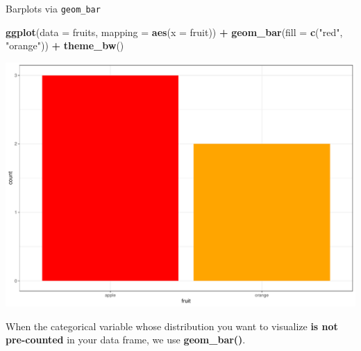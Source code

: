 \documentclass[
  ignorenonframetext,
]{beamer}
\newenvironment{Shaded}{\begin{snugshade}}{\end{snugshade}}
\newcommand{\AttributeTok}[1]{\textcolor[rgb]{0.13,0.29,0.53}{#1}}
\newcommand{\FunctionTok}[1]{\textcolor[rgb]{0.13,0.29,0.53}{\textbf{#1}}}
\newcommand{\NormalTok}[1]{#1}
\newcommand{\SpecialCharTok}[1]{\textcolor[rgb]{0.81,0.36,0.00}{\textbf{#1}}}
\newcommand{\StringTok}[1]{\textcolor[rgb]{0.31,0.60,0.02}{#1}}
\begin{document}
\begin{frame}[fragile]{Barplots via \texttt{geom\_bar}}
\protect\hypertarget{barplots-via-geom_bar}{}
\tiny

\begin{Shaded}
\begin{Highlighting}[]
\FunctionTok{ggplot}\NormalTok{(}\AttributeTok{data =}\NormalTok{ fruits, }\AttributeTok{mapping =} \FunctionTok{aes}\NormalTok{(}\AttributeTok{x =}\NormalTok{ fruit)) }\SpecialCharTok{+}
  \FunctionTok{geom\_bar}\NormalTok{(}\AttributeTok{fill =} \FunctionTok{c}\NormalTok{(}\StringTok{"red"}\NormalTok{, }\StringTok{"orange"}\NormalTok{)) }\SpecialCharTok{+} 
  \FunctionTok{theme\_bw}\NormalTok{()}
\end{Highlighting}
\end{Shaded}

\begin{center}\includegraphics[width=0.9\linewidth,height=0.5\textheight]{Week2_Lect_files/figure-beamer/unnamed-chunk-37-1} \end{center}
\normalsize

When the categorical variable whose distribution you want to visualize
\textbf{is not pre-counted} in your data frame, we use
\textbf{geom\_bar()}.
\end{frame}
\end{document}
